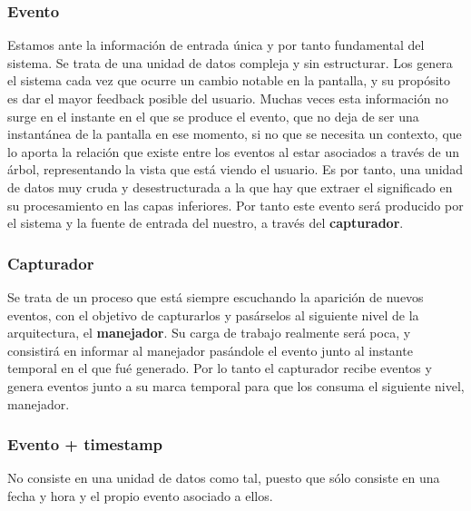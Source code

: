 \documentclass[12pt,a4paper,oneside]{book} %
\begin{document}
\subsubsection{Evento}
Estamos ante la información de entrada única y por tanto fundamental del sistema. Se trata de una unidad de datos compleja y sin estructurar. 
\newline
\newline
Los genera el sistema cada vez que ocurre un cambio notable en la pantalla, y su propósito es dar el mayor feedback posible del usuario. 
\newline
\newline
Muchas veces esta información no surge en el instante en el que se produce el evento, que no deja de ser una instantánea de la pantalla en ese momento, si no que se necesita un contexto, que lo aporta la relación que existe entre los eventos al estar asociados a través de un árbol, representando la vista que está viendo el usuario. 
\newline
\newline
Es por tanto, una unidad de datos muy cruda y desestructurada a la que hay que extraer el significado en su procesamiento en las capas inferiores. Por tanto este evento será producido por el sistema y la fuente de entrada del nuestro, a través del \textbf{capturador}.
\subsubsection{Capturador}
Se trata de un proceso que está siempre escuchando la aparición de nuevos eventos, con el objetivo de capturarlos y pasárselos al siguiente nivel de la arquitectura, el \textbf{manejador}. Su carga de trabajo realmente será poca, y consistirá en informar al manejador pasándole el evento junto al instante temporal en el que fué generado. 
\newline
\newline
Por lo tanto el capturador recibe eventos y genera eventos junto a su marca temporal para que los consuma el siguiente nivel, manejador. 
\subsubsection{Evento + timestamp}
No consiste en una unidad de datos como tal, puesto que sólo consiste en una fecha y hora y el propio evento asociado a ellos. 
\end{document}
